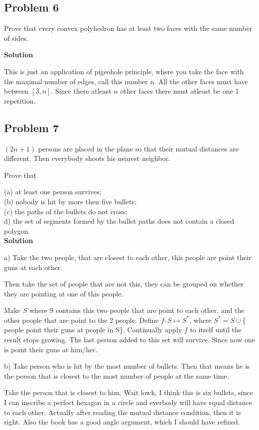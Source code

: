 \documentclass{article}
\begin{document}
\subsection{Problem 6}

Prove that every convex polyhedron has at least two faces with the same number of sides. 

\textbf{Solution}

This is just an application of pigeohole principle, where you take the face with the maximal number of edges, call this number n. 
All the other faces must have between $[3,n]$. Since there atleast $n$ other faces there must atleast be one 1 repetition.

\subsection{Problem 7}

$(2n + 1)$ persons are placed in the plane so that their mutual distances are different. 
Then everybody shoots his nearest neighbor. 

Prove that

(a) at least one person survives;\\
(b) nobody is hit by more then five bullets;\\ (c) the paths of the bullets do not cross;\\
d) the set of segments formed by the bullet paths does not contain a closed polygon.\\

\textbf{Solution}

a) Take the two people, that are closest to each other, this people are point their guns at each other.

Then take the set of people that are not this, they can be grouped on whether they are pointing at one of this people. 

Make $S$ where S contains this two people that are point to each other, and the other people that are point to the 2 people. 
Define $f : S \mapsto S^{*}$, where $S^{*}=S \cup $\{ people point their guns at people in S\}. Continually apply $f$ to itself until the result stops growing.
The last person added to this set will survive. Since now one is point their guns at him/her.

b) Take person who is hit by the most number of bullets. Then that means he is the person that is 
closest to the most number of people at the same time.

Take the person that is closest to him. Wait lowk, I think this is six bullets, since I can inscribe a perfect hexagon in a circle and everbody will have equal distance to each other.
Actually after reading the mutual distance condition, then it is right. Also the book has a good angle argument, which I should have refined.
\end{document}
